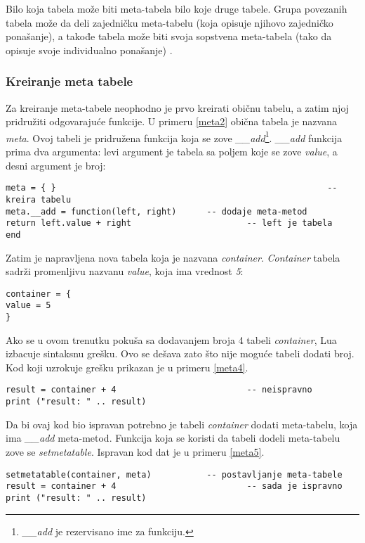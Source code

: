 \documentclass[a4paper]{article}
\begin{document}
Bilo koja tabela može biti meta-tabela bilo koje druge tabele. Grupa povezanih tabela može da deli zajedničku meta-tabelu (koja opisuje njihovo zajedničko ponašanje), a takođe tabela može biti svoja sopstvena meta-tabela (tako da opisuje svoje individualno ponašanje) \cite{bookProgInLua}.

\subsubsection*{Kreiranje meta tabele}
Za kreiranje meta-tabele neophodno je prvo kreirati običnu tabelu, a zatim njoj pridružiti odgovarajuće funkcije. U primeru \ref{meta2} obična tabela je nazvana \textit{meta}. Ovoj tabeli je pridružena funkcija koja se zove \textit{\_\_add}\footnote{\textit{\_\_add} je rezervisano ime za funkciju.}. \textit{\_\_add} funkcija prima dva argumenta: levi argument je tabela sa poljem koje se zove \textit{value}, a desni argument je broj:
\begin{lstlisting}[caption={Kreiranje meta-tabele i dodavanje meta-metoda \cite{bookProgInLua}},frame=single, label=meta2]
meta = { } 														-- kreira tabelu
meta.__add = function(left, right)		-- dodaje meta-metod
return left.value + right 						-- left je tabela
end
\end{lstlisting}
Zatim je napravljena nova tabela koja je nazvana \textit{container}. \textit{Container} tabela sadrži promenljivu nazvanu \textit{value}, koja ima vrednost \textit{5}:
\begin{lstlisting}[caption={Tabela \textit{container} \cite{bookProgInLua}},frame=single, label=meta3]
container = {
value = 5
}
\end{lstlisting}
Ako se u ovom trenutku pokuša sa dodavanjem broja 4 tabeli \textit{container}, Lua izbacuje sintaksnu grešku. Ovo se dešava zato što nije moguće tabeli dodati broj. Kod koji uzrokuje grešku prikazan je u primeru \ref{meta4}.
\begin{lstlisting}[caption={Neispravno sabiranje tabele i broja \cite{bookProgInLua}},frame=single, label=meta4]
result = container + 4 							-- neispravno
print ("result: " .. result)
\end{lstlisting}
Da bi ovaj kod bio ispravan potrebno je tabeli \textit{container} dodati meta-tabelu, koja ima \textit{\_\_add} meta-metod. Funkcija koja se koristi da tabeli dodeli meta-tabelu zove se \textit{setmetatable}. Ispravan kod dat je u primeru \ref{meta5}.
\begin{lstlisting}[caption={Ispravno sabiranje tabele i broja \cite{bookProgInLua}},frame=single, label=meta5]
setmetatable(container, meta) 			-- postavljanje meta-tabele
result = container + 4 							-- sada je ispravno
print ("result: " .. result)
\end{lstlisting}
\end{document}
